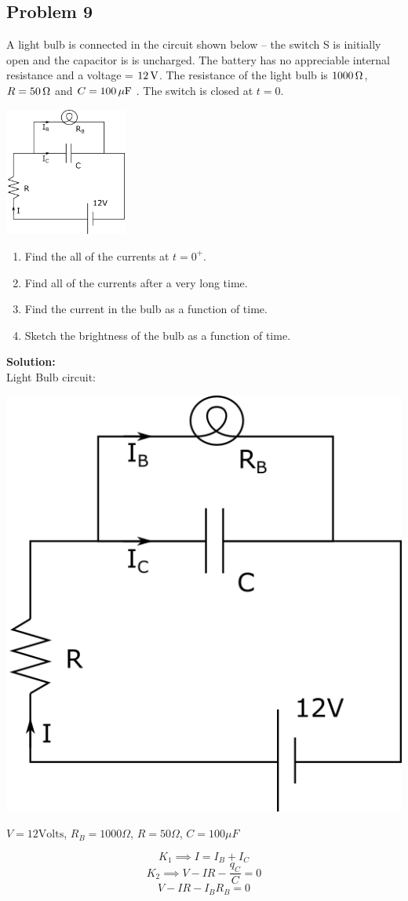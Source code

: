 \subsection*{Problem 9}
A light bulb is connected in the circuit shown below -- the switch S is initially open and the
capacitor is is uncharged. The battery has no appreciable internal resistance and a voltage = $12\,\mathrm{V}$. The
resistance of the light bulb is $1000 \,\mathrm{\Omega}$, $R = 50\,\mathrm{\Omega}$ and $C = 100\,\mathrm{\mu F}$ . The switch is closed at $t=0$.\\
\centerline{\includegraphics[width=0.3\textwidth]{Images/P9img2.png}}
\begin{enumerate}
    \item Find the all of the currents at $t=0^+$.
    \item Find all of the currents after a very long time.
    \item Find the current in the bulb as a function of time.
    \item Sketch the brightness of the bulb as a function of time.
\end{enumerate}

\textbf{Solution:}\\
Light Bulb circuit:
\vspace{5mm}

\includegraphics[width=0.35\linewidth]{Images/P9img2.png}

$V=12\textrm{Volts}$, $R_B=1000\Omega$, $R=50\Omega$, $C=100\mu F$


$$K_1 \implies I = I_B+I_C$$
$$K_2 \implies V-IR-\frac{q_C}{C}=0$$
$$V-IR-I_BR_B=0$$

